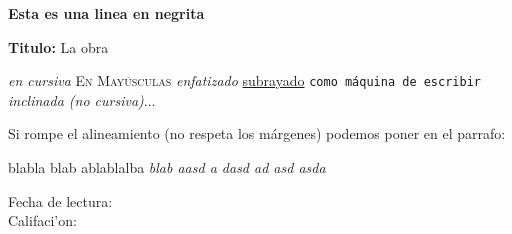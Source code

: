 \bfseries Esta es una linea en negrita

{\bfseries Titulo:} La obra


\textit{en cursiva}
\textsc{En Mayúsculas}
\emph{enfatizado} %
\underline{subrayado}
\texttt{como máquina de escribir}
\textsl{inclinada (no cursiva)}...


Si \emph{} rompe el alineamiento (no respeta los márgenes) podemos poner en el parrafo:
\begin{sloppypar}
blabla blab ablablalba \emph{blab aasd a dasd ad asd asda}
\end{sloppypar}




\vspace{2cm}

\hspace{2cm}

\raggedright
\raggedleft
\centering

\indent
\noindent

\vfill

\begin{doublespace}
  Fecha de lectura:\\
  Califaci'on:
\end{doublespace}

\newpage
\thispagestyle{empty}
\mbox{}

\usepackage{emptypage}
\cleardoublepage
